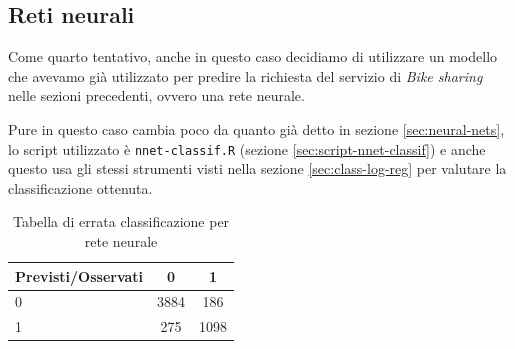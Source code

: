 
\subsection{Reti neurali}\label{sec:class-nnet}

Come quarto tentativo, anche in questo caso decidiamo di utilizzare un modello
che avevamo già utilizzato per predire la richiesta del servizio di \emph{Bike
sharing} nelle sezioni precedenti, ovvero una rete neurale.

Pure in questo caso cambia poco da quanto già detto in sezione
\ref{sec:neural-nets}, lo script utilizzato è \texttt{nnet-classif.R} (sezione
\ref{sec:script-nnet-classif}) e anche questo usa gli stessi strumenti visti
nella sezione \ref{sec:class-log-reg} per valutare la classificazione ottenuta.

\begin{table}[H]
\begin{center}
\begin{tabular}{ | l || c | c | }
  \hline
    Previsti/Osservati & 0 & 1 \\ \hline \hline
    0 & 3884 & 186 \\ \hline
    1 & 275 & 1098 \\ \hline
\end{tabular}
  \caption{Tabella di errata classificazione per rete neurale}
\end{center}
\end{table}

